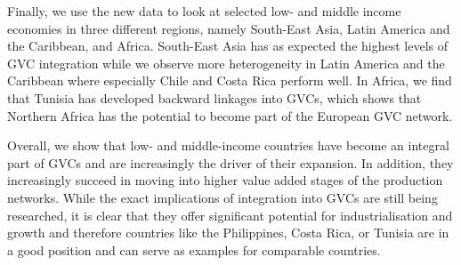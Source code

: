 \documentclass[11pt,a4paper]{article}
\begin{document}
Finally, we use the new data to look at selected low- and middle income economies in three different regions, namely South-East Asia, Latin America and the Caribbean, and Africa. South-East Asia has as expected the highest levels of GVC integration while we observe more heterogeneity in Latin America and the Caribbean where especially Chile and Costa Rica perform well. In Africa, we find that Tunisia has developed backward linkages into GVCs, which shows that Northern Africa has the potential to become part of the European GVC network.

Overall, we show that low- and middle-income countries have become an integral part of GVCs and are increasingly the driver of their expansion. In addition, they increasingly succeed in moving into higher value added stages of the production networks. While the exact implications of integration into GVCs are still being researched, it is clear that they offer significant potential for industrialisation and growth and therefore countries like the Philippines, Costa Rica, or Tunisia are in a good position and can serve as examples for comparable countries.


\clearpage




\clearpage
\end{document}
